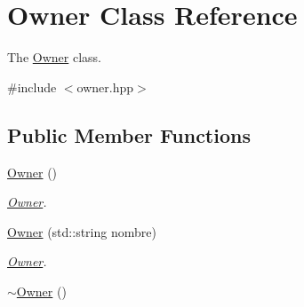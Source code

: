 \hypertarget{classOwner}{}\section{Owner Class Reference}
\label{classOwner}


The \hyperlink{classOwner}{Owner} class.  




{\ttfamily \#include $<$owner.\+hpp$>$}

\subsection*{Public Member Functions}
\begin{DoxyCompactItemize}
\item 
\hyperlink{classOwner_ab9186e9839a04fe48baad103cc1d0ddb}{Owner} ()
\begin{DoxyCompactList}\small\item\em \hyperlink{classOwner}{Owner}. \end{DoxyCompactList}\item 
\hyperlink{classOwner_a876e5d2ec5c7f0474ac61ae18256a78d}{Owner} (std\+::string nombre)
\begin{DoxyCompactList}\small\item\em \hyperlink{classOwner}{Owner}. \end{DoxyCompactList}\item 
\hypertarget{classOwner_a1ab2bfec69ca4645de7f113f20e868c3}{}\hyperlink{classOwner_a1ab2bfec69ca4645de7f113f20e868c3}{$\sim$\+Owner} ()\label{classOwner_a1ab2bfec69ca4645de7f113f20e868c3}


\end{DoxyCompactItemize}
